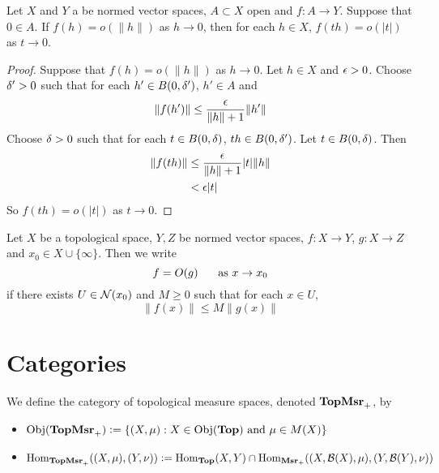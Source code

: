 \documentclass{book}
\begin{document}
 \begin{ex} \lex{}
 	Let $X$ and $Y$ a be normed vector spaces, $A \subset X$ open and $f:A \rightarrow Y$. Suppose that $0 \in A$. If $f(h) = o(\|h\|)$ as $h \rightarrow 0$, then for each $h \in X$,  $f(th) = o(|t|)$ as $t \rightarrow 0$.
 \end{ex}	
 
 \begin{proof}
 	Suppose that $f(h) = o(\|h\|)$ as $h \rightarrow 0$.  Let $h \in X$ and $\epsilon >0$. Choose $\delta' >0 $ such that for each $h' \in B(0, \delta')$, $h' \in A$ and 
 	$$\|f(h')\| \leq \frac{\epsilon}{\|h\|+1} \|h'\|$$ 
 	Choose $\delta >0$ such that for each $t \in B(0,\delta)$, $th \in B(0,\delta')$. Let $t \in B(0,\delta)$. Then 
 	\begin{align*}
 		\|f(th)\| 
 		&\leq \frac{\epsilon}{\|h\|+1} |t|\|h\| \\
 		&< \epsilon |t|
 	\end{align*}
 	So $f(th) = o(|t|)$ as $t \rightarrow 0$.
 \end{proof}		
 
 
 
 
 \begin{defn} \ld{}
 	Let $X$ be a topological space, $Y, Z$ be normed vector spaces, $f:X \rightarrow Y$, $g: X \rightarrow Z$ and $x_0 \in X \cup \{\infty\}$. Then we write $$f = O(g) \hspace{.5cm} \text{ as } x \rightarrow x_0$$ if there exists $U \in \mathcal{N}(x_0)$ and $M \geq 0$ such that for each $x \in U$, $$\|f(x)\| \leq M\|g(x)\|$$
 \end{defn}
 
 
 
 
 
 
 
 
 
 
 
 
 
 
 
 
 
 
 
 
 
 
 
 
 
 
 
 \newpage
 \chapter{Categories}
 
 
 \begin{defn}
 	We define the category of topological measure spaces, denoted $\operatorname*{\text{\textbf{TopMsr}}_{+}}$, by 
 	\begin{itemize}
 		\item $\operatorname{Obj}(\operatorname*{\text{\textbf{TopMsr}}_{+}}) \vcentcolon= \{(X, \mu): X \in \operatorname{Obj}(\operatorname*{\text{\textbf{Top}}}) \text{ and } \mu \in M(X)\}$			
 		\item $\operatorname{Hom}_{\operatorname*{\text{\textbf{TopMsr}}_{+}}}((X, \mu), (Y, \nu)) \vcentcolon= \operatorname{Hom}_{\operatorname*{\text{\textbf{Top}}}}(X, Y) \cap \operatorname{Hom}_{\operatorname*{\text{\textbf{Msr}}_{+}}}((X, \mathcal{B}(X), \mu), (Y, \mathcal{B}(Y), \nu))$
 	\end{itemize}
 \end{defn}
 
\end{document}
